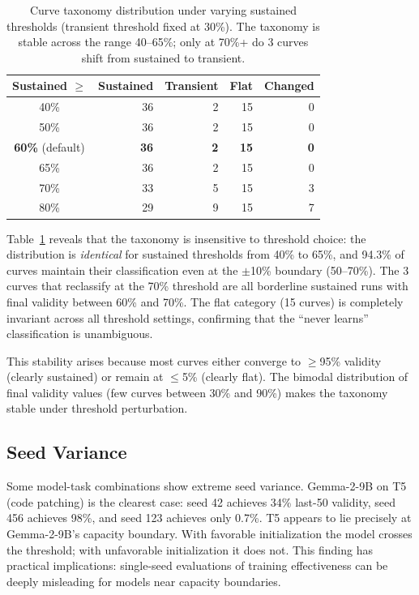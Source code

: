 \documentclass[11pt]{article}
\begin{document}
\begin{table}[t]
\centering
\caption{Curve taxonomy distribution under varying sustained thresholds (transient threshold fixed at 30\%).  The taxonomy is stable across the range 40--65\%; only at 70\%+ do 3 curves shift from sustained to transient.}
\label{tab:sensitivity}
\small
\begin{tabular}{c rrr r}
\toprule
\textbf{Sustained $\geq$} & \textbf{Sustained} & \textbf{Transient} & \textbf{Flat} & \textbf{Changed} \\
\midrule
40\% & 36 & 2 & 15 & 0 \\
50\% & 36 & 2 & 15 & 0 \\
\textbf{60\%} (default) & \textbf{36} & \textbf{2} & \textbf{15} & \textbf{0} \\
65\% & 36 & 2 & 15 & 0 \\
70\% & 33 & 5 & 15 & 3 \\
80\% & 29 & 9 & 15 & 7 \\
\bottomrule
\end{tabular}
\end{table}

Table~\ref{tab:sensitivity} reveals that the taxonomy is insensitive to threshold choice: the distribution is \emph{identical} for sustained thresholds from 40\% to 65\%, and 94.3\% of curves maintain their classification even at the $\pm$10\% boundary (50--70\%).  The 3 curves that reclassify at the 70\% threshold are all borderline sustained runs with final validity between 60\% and 70\%.  The flat category (15 curves) is completely invariant across all threshold settings, confirming that the ``never learns'' classification is unambiguous.

This stability arises because most curves either converge to $\geq$95\% validity (clearly sustained) or remain at $\leq$5\% (clearly flat).  The bimodal distribution of final validity values (few curves between 30\% and 90\%) makes the taxonomy stable under threshold perturbation.

\subsection{Seed Variance}

Some model-task combinations show extreme seed variance.  Gemma-2-9B on T5 (code patching) is the clearest case: seed 42 achieves 34\% last-50 validity, seed 456 achieves 98\%, and seed 123 achieves only 0.7\%.  T5 appears to lie precisely at Gemma-2-9B's capacity boundary.  With favorable initialization the model crosses the threshold; with unfavorable initialization it does not.  This finding has practical implications: single-seed evaluations of training effectiveness can be deeply misleading for models near capacity boundaries.
\end{document}

